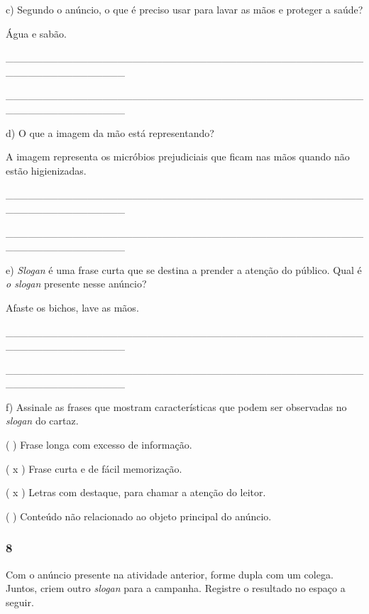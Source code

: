 c) Segundo o anúncio, o que é preciso usar para lavar as mãos e proteger a saúde?

Água e sabão.

\_\_\_\_\_\_\_\_\_\_\_\_\_\_\_\_\_\_\_\_\_\_\_\_\_\_\_\_\_\_\_\_\_\_\_\_\_\_\_\_\_\_\_\_\_\_\_\_\_\_\_\_\_\_\_\_\_\_\_\_\_\_\_\_

\_\_\_\_\_\_\_\_\_\_\_\_\_\_\_\_\_\_\_\_\_\_\_\_\_\_\_\_\_\_\_\_\_\_\_\_\_\_\_\_\_\_\_\_\_\_\_\_\_\_\_\_\_\_\_\_\_\_\_\_\_\_\_\_

d) O que a imagem da mão está representando?

A imagem representa os micróbios prejudiciais que ficam nas mãos quando não estão higienizadas.

\_\_\_\_\_\_\_\_\_\_\_\_\_\_\_\_\_\_\_\_\_\_\_\_\_\_\_\_\_\_\_\_\_\_\_\_\_\_\_\_\_\_\_\_\_\_\_\_\_\_\_\_\_\_\_\_\_\_\_\_\_\_\_\_

\_\_\_\_\_\_\_\_\_\_\_\_\_\_\_\_\_\_\_\_\_\_\_\_\_\_\_\_\_\_\_\_\_\_\_\_\_\_\_\_\_\_\_\_\_\_\_\_\_\_\_\_\_\_\_\_\_\_\_\_\_\_\_\_

e) \emph{Slogan} é uma frase curta que se destina a prender a atenção do
público. Qual é \emph{o slogan} presente nesse anúncio?

Afaste os bichos, lave as mãos.

\_\_\_\_\_\_\_\_\_\_\_\_\_\_\_\_\_\_\_\_\_\_\_\_\_\_\_\_\_\_\_\_\_\_\_\_\_\_\_\_\_\_\_\_\_\_\_\_\_\_\_\_\_\_\_\_\_\_\_\_\_\_\_\_

\_\_\_\_\_\_\_\_\_\_\_\_\_\_\_\_\_\_\_\_\_\_\_\_\_\_\_\_\_\_\_\_\_\_\_\_\_\_\_\_\_\_\_\_\_\_\_\_\_\_\_\_\_\_\_\_\_\_\_\_\_\_\_\_

f) Assinale as frases que mostram características que podem ser
observadas no \emph{slogan} do cartaz.

( ) Frase longa com excesso de informação.

( x ) Frase curta e de fácil memorização.

( x ) Letras com destaque, para chamar a atenção do leitor.

( ) Conteúdo não relacionado ao objeto principal do anúncio.

\subsubsection{8}\label{section-41}

Com o anúncio presente na atividade anterior, forme dupla com um colega. Juntos, criem outro \emph{slogan} para a
campanha. Registre o resultado no espaço a seguir.

